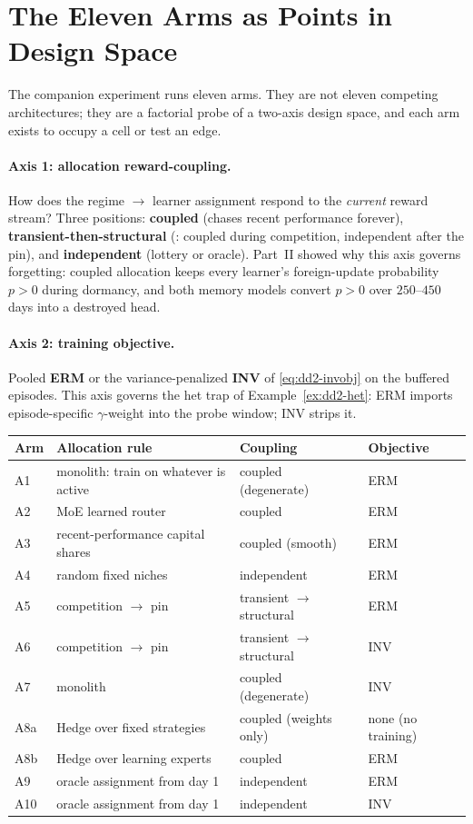 \section{The Eleven Arms as Points in Design Space}
\label{sec:dd2-arms}

The companion experiment runs eleven arms. They are not eleven competing
architectures; they are a factorial probe of a two-axis design space, and
each arm exists to occupy a cell or test an edge.

\paragraph{Axis 1: allocation reward-coupling.} How does the regime
$\to$ learner assignment respond to the \emph{current} reward stream?
Three positions: \textbf{coupled} (chases recent performance forever),
\textbf{transient-then-structural} (\nm{}: coupled during competition,
independent after the pin), and \textbf{independent} (lottery or oracle).
Part~II showed why this axis governs forgetting: coupled allocation keeps
every learner's foreign-update probability $p > 0$ during dormancy, and both
memory models convert $p > 0$ over $250$--$450$ days into a destroyed head.

\paragraph{Axis 2: training objective.} Pooled \textbf{ERM} or the
variance-penalized \textbf{INV} of \eqref{eq:dd2-invobj} on the buffered
episodes. This axis governs the het trap of Example~\ref{ex:dd2-het}: ERM
imports episode-specific $\gamma$-weight into the probe window; INV strips
it.

\begin{center}
\begin{tabular}{llll}
\toprule
Arm & Allocation rule & Coupling & Objective \\
\midrule
A1 & monolith: train on whatever is active & coupled (degenerate) & ERM \\
A2 & MoE learned router & coupled & ERM \\
A3 & recent-performance capital shares & coupled (smooth) & ERM \\
A4 & random fixed niches & independent & ERM \\
A5 & \nm{} competition $\to$ pin & transient $\to$ structural & ERM \\
A6 & \nm{} competition $\to$ pin & transient $\to$ structural & INV \\
A7 & monolith & coupled (degenerate) & INV \\
A8a & Hedge over fixed strategies & coupled (weights only) & none (no training) \\
A8b & Hedge over learning experts & coupled & ERM \\
A9 & oracle assignment from day 1 & independent & ERM \\
A10 & oracle assignment from day 1 & independent & INV \\
\bottomrule
\end{tabular}
\end{center}

